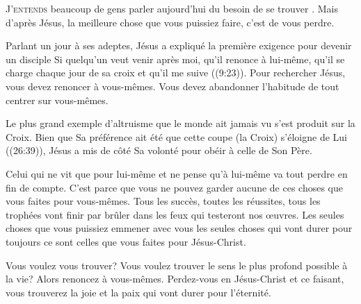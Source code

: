 


\lettrine{J}{'entends} beaucoup de gens parler aujourd'hui du besoin
 de \Og se trouver \Fg{}. Mais d'après Jésus, la meilleure chose
 que vous puissiez faire, c'est de vous perdre. 

Parlant un jour à ses adeptes, Jésus a expliqué la première exigence
 pour devenir un disciple\frcolon{} \Og Si quelqu'un veut venir après moi,
 qu'il renonce à lui-même, qu'il se charge chaque jour de sa croix
 et qu'il me suive \Fg{} ((9:23)).
 Pour rechercher Jésus, vous devez renoncer à vous-mêmes.
 Vous devez abandonner l'habitude de tout centrer sur vous-mêmes. 

Le plus grand exemple d'altruisme que le monde ait jamais vu
 s'est produit sur la Croix. Bien que Sa préférence ait été
 que cette coupe (la Croix) s'éloigne de Lui ((26:39)),
 Jésus a mis de côté Sa volonté pour obéir à celle de Son Père. 


Celui qui ne vit que pour lui-même et ne pense qu'à lui-même va tout perdre
 en fin de compte. C'est parce que vous ne pouvez garder aucune
 de ces choses que vous faites pour vous-mêmes. Tous les succès,
 toutes les réussites, tous les trophées vont finir par brûler
 dans les feux qui testeront nos \oe{}uvres. Les seules choses
 que vous puissiez emmener avec vous \ocadr les seules choses
 qui vont durer pour toujours \fcadr{} ce sont celles
 que vous faites pour Jésus-Christ. 

Vous voulez vous trouver? Vous voulez trouver le sens le plus profond
 possible à la vie? Alors renoncez à vous-mêmes. Perdez-vous
 en Jésus-Christ et ce faisant, vous trouverez la joie et la paix
 qui vont durer pour l'éternité. 

\dvrule






